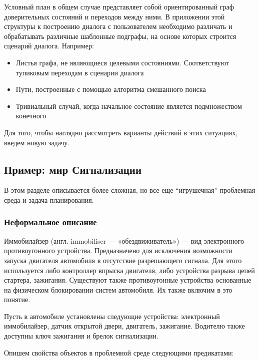Условный план в общем случае представляет собой ориентированный граф доверительных состояний и переходов между ними. В приложении этой структуры к построению диалога с пользователем необходимо различать и обрабатывать различные шаблонные подграфы, на основе которых строится сценарий диалога. Например:

\begin{itemize}
 \item Листья графа, не являющиеся целевыми состояниями. Соответствуют тупиковым переходам в сценарии диалога
 \item Пути, построенные с помощью алгоритма смешанного поиска
 \item Тривиальный случай, когда начальное состояние является подмножеством конечного
\end{itemize}

Для того, чтобы наглядно рассмотреть варианты действий в этих ситуациях, введем новую задачу.

\subsection{Пример: мир Сигнализации}

В этом разделе описывается более сложная, но все еще ``игрушечная''
проблемная среда и задача планирования.

\subsubsection{Неформальное описание}

Иммобилайзер (англ. immobiliser --- «обездвиживатель») --- вид
электронного противоугонного устройства. Предназначено для исключения
возможности запуска двигателя автомобиля в отсутствие разрешающего
сигнала. Для этого используется либо контроллер впрыска двигателя, либо
устройства разрыва цепей стартера, зажигания. Существуют также
противоугонные устройства основанные на физическом блокировании систем
автомобиля. Их также включим в это понятие.

Пусть в автомобиле установлены следующие устройства:
электронный иммобилайзер, датчик открытой двери, двигатель, зажигание. Водителю также доступны ключ зажигания и брелок сигнализации.

Опишем свойства объектов в проблемной среде следующими предикатами:

